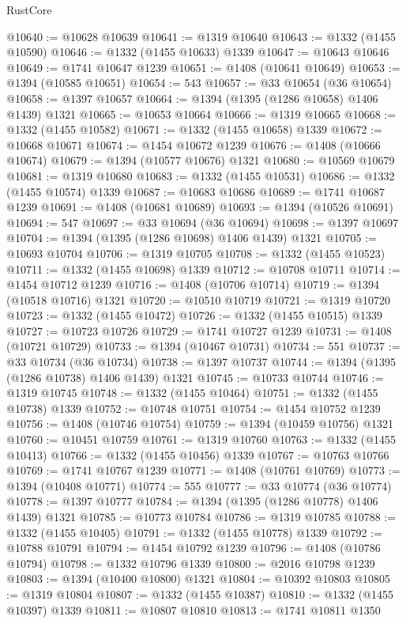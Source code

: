 \begin{lexlean}{RustCore}
\begin{coremodule}
@10640 := @10628 @10639
@10641 := @1319 @10640
@10643 := @1332 (@1455 @10590)
@10646 := @1332 (@1455 @10633) @1339
@10647 := @10643 @10646
@10649 := @1741 @10647 @1239
@10651 := @1408 (@10641 @10649)
@10653 := @1394 (@10585 @10651)
@10654 := 543
@10657 := @33 @10654 (@36 @10654)
@10658 := @1397 @10657
@10664 := @1394 (@1395 (@1286 @10658) @1406 @1439) @1321
@10665 := @10653 @10664
@10666 := @1319 @10665
@10668 := @1332 (@1455 @10582)
@10671 := @1332 (@1455 @10658) @1339
@10672 := @10668 @10671
@10674 := @1454 @10672 @1239
@10676 := @1408 (@10666 @10674)
@10679 := @1394 (@10577 @10676) @1321
@10680 := @10569 @10679
@10681 := @1319 @10680
@10683 := @1332 (@1455 @10531)
@10686 := @1332 (@1455 @10574) @1339
@10687 := @10683 @10686
@10689 := @1741 @10687 @1239
@10691 := @1408 (@10681 @10689)
@10693 := @1394 (@10526 @10691)
@10694 := 547
@10697 := @33 @10694 (@36 @10694)
@10698 := @1397 @10697
@10704 := @1394 (@1395 (@1286 @10698) @1406 @1439) @1321
@10705 := @10693 @10704
@10706 := @1319 @10705
@10708 := @1332 (@1455 @10523)
@10711 := @1332 (@1455 @10698) @1339
@10712 := @10708 @10711
@10714 := @1454 @10712 @1239
@10716 := @1408 (@10706 @10714)
@10719 := @1394 (@10518 @10716) @1321
@10720 := @10510 @10719
@10721 := @1319 @10720
@10723 := @1332 (@1455 @10472)
@10726 := @1332 (@1455 @10515) @1339
@10727 := @10723 @10726
@10729 := @1741 @10727 @1239
@10731 := @1408 (@10721 @10729)
@10733 := @1394 (@10467 @10731)
@10734 := 551
@10737 := @33 @10734 (@36 @10734)
@10738 := @1397 @10737
@10744 := @1394 (@1395 (@1286 @10738) @1406 @1439) @1321
@10745 := @10733 @10744
@10746 := @1319 @10745
@10748 := @1332 (@1455 @10464)
@10751 := @1332 (@1455 @10738) @1339
@10752 := @10748 @10751
@10754 := @1454 @10752 @1239
@10756 := @1408 (@10746 @10754)
@10759 := @1394 (@10459 @10756) @1321
@10760 := @10451 @10759
@10761 := @1319 @10760
@10763 := @1332 (@1455 @10413)
@10766 := @1332 (@1455 @10456) @1339
@10767 := @10763 @10766
@10769 := @1741 @10767 @1239
@10771 := @1408 (@10761 @10769)
@10773 := @1394 (@10408 @10771)
@10774 := 555
@10777 := @33 @10774 (@36 @10774)
@10778 := @1397 @10777
@10784 := @1394 (@1395 (@1286 @10778) @1406 @1439) @1321
@10785 := @10773 @10784
@10786 := @1319 @10785
@10788 := @1332 (@1455 @10405)
@10791 := @1332 (@1455 @10778) @1339
@10792 := @10788 @10791
@10794 := @1454 @10792 @1239
@10796 := @1408 (@10786 @10794)
@10798 := @1332 @10796 @1339
@10800 := @2016 @10798 @1239
@10803 := @1394 (@10400 @10800) @1321
@10804 := @10392 @10803
@10805 := @1319 @10804
@10807 := @1332 (@1455 @10387)
@10810 := @1332 (@1455 @10397) @1339
@10811 := @10807 @10810
@10813 := @1741 @10811 @1350

\end{coremodule}
\end{lexlean}

